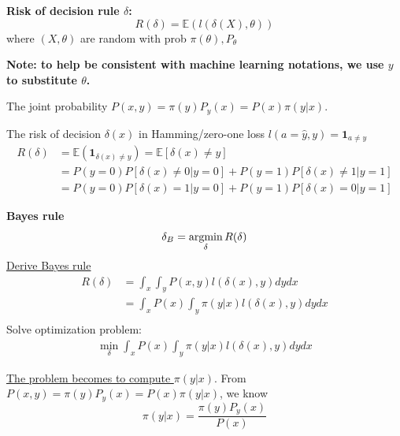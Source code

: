 \documentclass[11pt]{elegantbook}
\newcommand{\argmin}{\operatornamewithlimits{argmin}}
\begin{document}
\textbf{Risk of decision rule $\delta$:} $$R(\delta)=\mathbb{E}\left(l(\delta(X),\theta)\right)$$ where $(X,\theta)$ are random with prob $\pi(\theta),P_\theta$

\textbf{Note: to help be consistent with machine learning notations, we use $y$ to substitute $\theta$.}

The joint probability $P(x,y)=\pi(y)P_y(x)=P(x)\pi(y|x)$.

\begin{example}
    The risk of decision $\delta(x)$ in Hamming/zero-one loss $l(a=\hat{y},y)=\mathbf{1}_{a\neq y}$
    \begin{equation}
        \begin{aligned}
            R(\delta)&=\mathbb{E}(\mathbf{1}_{\delta(x)\neq y})=\mathbb{E}[\delta(x)\neq y]\\
            &=P(y=0)P[\delta(x)\neq 0|y=0]+P(y=1)P[\delta(x)\neq 1|y=1]\\
            &=P(y=0)P[\delta(x)=1|y=0]+P(y=1)P[\delta(x)=0|y=1]
        \end{aligned}
        \nonumber
    \end{equation}
\end{example}

\textbf{Bayes rule}
$$\delta_B=\argmin_\delta R(\delta)$$
\underline{Derive Bayes rule}
\begin{equation}
    \begin{aligned}
        R(\delta)&=\int_x\int_y P(x,y) l(\delta(x),y) dy dx\\
        &=\int_x P(x)\int_y \pi(y|x) l(\delta(x),y) dy dx\\
    \end{aligned}
    \nonumber
\end{equation}
Solve optimization problem:
\begin{equation}
    \begin{aligned}
        \min_\delta \int_x P(x)\int_y \pi(y|x) l(\delta(x),y) dy dx
    \end{aligned}
    \nonumber
\end{equation}
\begin{center}
\end{center}
\underline{The problem becomes to compute $\pi(y|x)$}. From $P(x,y)=\pi(y)P_y(x)=P(x)\pi(y|x)$, we know $$\pi(y|x)=\frac{\pi(y)P_y(x)}{P(x)}$$
\end{document}

